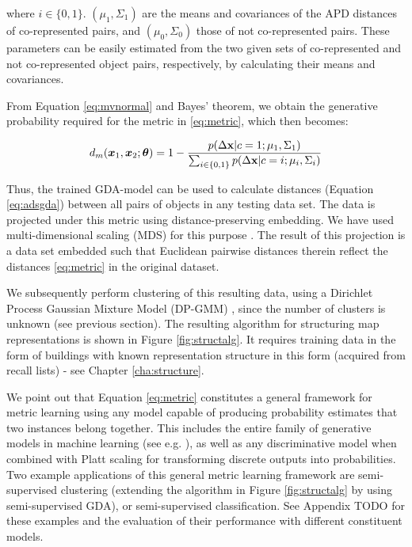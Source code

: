 where $i \in \{0,1\}$. $(\mu_1, \Sigma_1)$ are the means and covariances of the APD distances of co-represented pairs, and $(\mu_0, \Sigma_0)$ those of not co-represented pairs. These parameters can be easily estimated from the two given sets of co-represented and not co-represented object pairs, respectively, by calculating their means and covariances.

From Equation \ref{eq:mvnormal} and Bayes' theorem, we obtain the generative probability required for the metric in \ref{eq:metric}, which then becomes:

\begin{equation}
\label{eq:adsgda}
d_m(\boldsymbol x_1, \boldsymbol x_2; \boldsymbol{\theta}) = 1 - \frac{p( \Delta \textbf x | c=1; \mu_1, \Sigma_1)}{\sum_{i \in \{0,1\}} {p( \Delta \textbf x | c=i; \mu_i, \Sigma_i)}}
\end{equation}

Thus, the trained GDA-model can be used to calculate distances (Equation \ref{eq:adsgda}) between all pairs of objects in any testing data set. The data is projected under this metric using distance-preserving embedding. We have used multi-dimensional scaling (MDS) for this purpose \citep{borg2005modern}. The result of this projection is a data set embedded such that Euclidean pairwise distances therein reflect the distances \ref{eq:metric} in the original dataset.

We subsequently perform clustering of this resulting data, using a Dirichlet Process Gaussian Mixture Model (DP-GMM) \citep{rasmussen1999infinite}, since the number of clusters is unknown (see previous section). The resulting algorithm for structuring map representations is shown in Figure \ref{fig:structalg}. It requires training data in the form of buildings with known representation structure in this form (acquired from recall lists) - see Chapter \ref{cha:structure}.

We point out that Equation \ref{eq:metric} constitutes a general framework for metric learning using any model capable of producing probability estimates that two instances belong together. This includes the entire family of generative models in machine learning (see e.g. \citep{bishop2006pattern}), as well as any discriminative model when combined with Platt scaling \citep{platt1999probabilistic} for transforming discrete outputs into probabilities. Two example applications of this general metric learning framework are semi-supervised clustering (extending the algorithm in Figure \ref{fig:structalg} by using semi-supervised GDA), or semi-supervised classification. See Appendix TODO for these examples and the evaluation of their performance with different constituent models.


